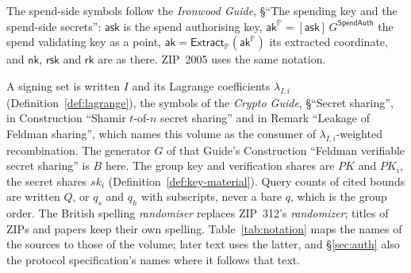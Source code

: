 \documentclass[11pt,a4paper]{article}
\theoremstyle{definition}
\newcommand{\PP}{\mathbb{P}}
\newcommand{\rk}{\mathsf{rk}}
\newcommand{\Extract}{\ensuremath{\mathsf{Extract}}}
\newcommand{\ask}{\ensuremath{\mathsf{ask}}}
\newcommand{\aksym}{\ensuremath{\mathsf{ak}}}
\newcommand{\nksym}{\ensuremath{\mathsf{nk}}}
\newcommand{\rsk}{\ensuremath{\mathsf{rsk}}}
\begin{document}
The spend-side symbols follow the \emph{Ironwood Guide}, \S``The spending
key and the spend-side secrets'': \(\ask\) is the spend authorising key,
\(\aksym^{\PP} = [\ask]\,G^{\mathsf{SpendAuth}}\) the spend validating key
as a point, \(\aksym = \Extract_{\PP}(\aksym^{\PP})\) its extracted
coordinate, and \(\nksym\), \(\rsk\) and \(\rk\) are as there. ZIP~2005 uses
the same notation.

A signing set is written \(I\) and its Lagrange coefficients
\(\lambda_{I,i}\) (Definition~\ref{def:lagrange}), the symbols of the
\emph{Crypto Guide}, \S``Secret sharing'', in Construction ``Shamir
\(t\)-of-\(n\) secret sharing'' and in Remark ``Leakage of Feldman sharing'', which names this volume as the consumer of
\(\lambda_{I,i}\)-weighted recombination. The generator \(G\) of that
Guide's Construction ``Feldman verifiable secret sharing'' is \(B\) here. The
group key and verification shares are \(\mathit{PK}\) and \(\mathit{PK}_i\),
the secret shares \(\mathit{sk}_i\) (Definition~\ref{def:key-material}).
Query counts of cited bounds are written \(Q\), or \(q_s\) and \(q_h\) with
subscripts, never a bare \(q\), which is the group order. The British
spelling \emph{randomiser} replaces ZIP~312's \emph{randomizer}; titles of
ZIPs and papers keep their own spelling. Table~\ref{tab:notation} maps the
names of the sources to those of the volume; later text uses the latter,
and \S\ref{sec:auth} also the protocol specification's names where it
follows that text.
\end{document}
